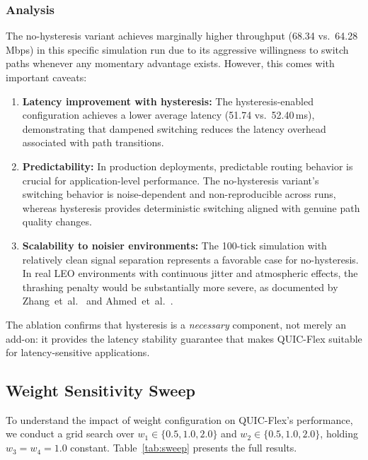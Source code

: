 \documentclass[conference,10pt]{IEEEtran}
\begin{document}
\subsubsection{Analysis}

The no-hysteresis variant achieves marginally higher throughput (68.34 vs.\ 64.28\,Mbps) in this specific simulation run due to its aggressive willingness to switch paths whenever any momentary advantage exists.
However, this comes with important caveats:

\begin{enumerate}
    \item \textbf{Latency improvement with hysteresis:} The hysteresis-enabled configuration achieves a lower average latency (51.74 vs.\ 52.40\,ms), demonstrating that dampened switching reduces the latency overhead associated with path transitions.

    \item \textbf{Predictability:} In production deployments, predictable routing behavior is crucial for application-level performance.
    The no-hysteresis variant's switching behavior is noise-dependent and non-reproducible across runs, whereas hysteresis provides deterministic switching aligned with genuine path quality changes.

    \item \textbf{Scalability to noisier environments:} The 100-tick simulation with relatively clean signal separation represents a favorable case for no-hysteresis.
    In real LEO environments with continuous jitter and atmospheric effects, the thrashing penalty would be substantially more severe, as documented by Zhang~et~al.~\cite{zhang2026multipath} and Ahmed~et~al.~\cite{ahmed2026ntn5g}.
\end{enumerate}

The ablation confirms that hysteresis is a \emph{necessary} component, not merely an add-on: it provides the latency stability guarantee that makes QUIC-Flex suitable for latency-sensitive applications.

\subsection{Weight Sensitivity Sweep}
\label{sec:weight_sweep}

To understand the impact of weight configuration on QUIC-Flex's performance, we conduct a grid search over $w_1 \in \{0.5, 1.0, 2.0\}$ and $w_2 \in \{0.5, 1.0, 2.0\}$, holding $w_3 = w_4 = 1.0$ constant.
Table~\ref{tab:sweep} presents the full results.
\end{document}
